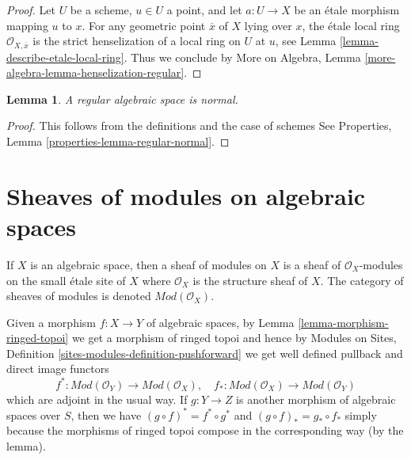 \documentclass{stacks-project}
\theoremstyle{plain}
\newtheorem{lemma}[subsection]{Lemma}
\theoremstyle{definition}
\theoremstyle{remark}
\numberwithin{equation}{subsection}
\begin{document}
\begin{proof}
Let $U$ be a scheme, $u \in U$ a point, and let $a : U \to X$ be an
\'etale morphism mapping $u$ to $x$. For any geometric point
$\overline{x}$ of $X$ lying over $x$, the \'etale local
ring $\mathcal{O}_{X, \overline{x}}$ is the strict henselization of
a local ring on $U$ at $u$, see
Lemma \ref{lemma-describe-etale-local-ring}.
Thus we conclude by
More on Algebra, Lemma \ref{more-algebra-lemma-henselization-regular}.
\end{proof}

\begin{lemma}
\label{lemma-regular-normal}
A regular algebraic space is normal.
\end{lemma}

\begin{proof}
This follows from the definitions and the case of schemes
See Properties, Lemma \ref{properties-lemma-regular-normal}.
\end{proof}

 








\section{Sheaves of modules on algebraic spaces}
\label{section-modules}

\noindent
If $X$ is an algebraic space, then a sheaf of modules on $X$ is
a sheaf of $\mathcal{O}_X$-modules on the small \'etale site of $X$
where $\mathcal{O}_X$ is the structure sheaf of $X$. The category
of sheaves of modules is denoted $\textit{Mod}(\mathcal{O}_X)$.

\medskip\noindent
Given a morphism $f : X \to Y$ of algebraic spaces, by
Lemma \ref{lemma-morphism-ringed-topoi}
we get a morphism of ringed topoi and hence by
Modules on Sites, Definition \ref{sites-modules-definition-pushforward}
we get well defined pullback and direct image functors
\begin{equation}
\label{equation-push-pull}
f^* :
\textit{Mod}(\mathcal{O}_Y)
\longrightarrow
\textit{Mod}(\mathcal{O}_X), \quad
f_* :
\textit{Mod}(\mathcal{O}_X)
\longrightarrow
\textit{Mod}(\mathcal{O}_Y)
\end{equation}
which are adjoint in the usual way. If $g : Y \to Z$ is another morphism
of algebraic spaces over $S$, then we have
$(g \circ f)^* = f^* \circ g^*$ and $(g \circ f)_* = g_* \circ f_*$
simply because the morphisms of ringed topoi compose in the corresponding
way (by the lemma).
\end{document}
